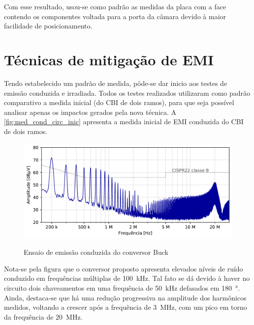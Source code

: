     Com esse resultado, usou-se como padrão as medidas da placa com a face contendo os componentes voltada para a porta da câmara devido à maior facilidade de posicionamento.
    
    \section{Técnicas de mitigação de EMI} \label{cap:result_tecnicas}
    
    Tendo estabelecido um padrão de medida, pôde-se dar inicio aos testes de emissão conduzida e irradiada. Todos os testes realizados utilizaram como padrão comparativo a medida inicial (do CBI de dois ramos), para que seja possível analisar apenas os impactos gerados pela nova técnica. A \autoref{fig:med_cond_circ_inic} apresenta a medida inicial de EMI conduzida do CBI de dois ramos. 
    
    \begin{figure}[H]
    	\centering
    	\caption{Ensaio de emissão conduzida do conversor Buck \Interleaved}
    	\includegraphics[scale=.9]{pdf/cond/Circuito inicial.pdf}
    	\label{fig:med_cond_circ_inic}
    \end{figure}
    
    Nota-se pela figura que o conversor proposto apresenta elevados níveis de ruído conduzido em frequências múltiplas de \SI{100}{\kilo\hertz}. Tal fato se dá devido à haver no circuito dois chaveamentos em uma frequência de \SI{50}{\kilo\hertz} defasados em \SI{180}{\degree}. Ainda, destaca-se que há uma redução progressiva na amplitude dos harmônicos medidos, voltando a crescer após a frequência de \SI{3}{\mega\hertz}, com um pico em torno da frequência de \SI{20}{\mega\hertz}.
    
